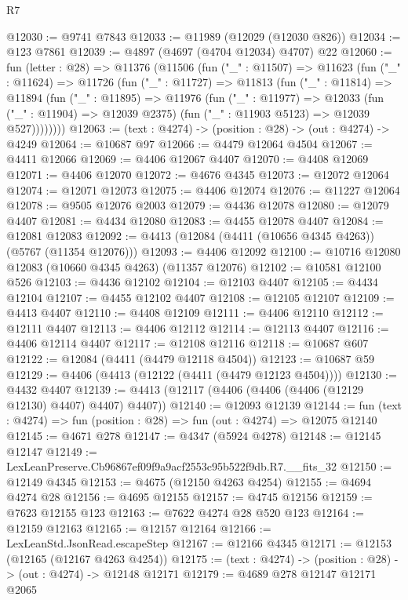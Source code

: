 \begin{lexlean}{R7}
\begin{coremodule}
@12030 := @9741 @7843
@12033 := @11989 (@12029 (@12030 @826))
@12034 := @123 @7861
@12039 := @4897 (@4697 (@4704 @12034) @4707) @22
@12060 := fun (letter : @28) =>
  @11376
    (@11506
      (fun ("_" : @11507) =>
      @11623
        (fun ("_" : @11624) =>
        @11726
          (fun ("_" : @11727) =>
          @11813
            (fun ("_" : @11814) =>
            @11894
              (fun ("_" : @11895) =>
              @11976
                (fun ("_" : @11977) =>
                @12033
                  (fun ("_" : @11904) => @12039 @2375)
                  (fun ("_" : @11903 @5123) => @12039 @527))))))))
@12063 := (text : @4274) -> (position : @28) -> (out : @4274) -> @4249
@12064 := @10687 @97
@12066 := @4479 @12064 @4504
@12067 := @4411 @12066
@12069 := @4406 @12067 @4407
@12070 := @4408 @12069
@12071 := @4406 @12070
@12072 := @4676 @4345
@12073 := @12072 @12064
@12074 := @12071 @12073
@12075 := @4406 @12074
@12076 := @11227 @12064
@12078 := @9505 @12076 @2003
@12079 := @4436 @12078
@12080 := @12079 @4407
@12081 := @4434 @12080
@12083 := @4455 @12078 @4407
@12084 := @12081 @12083
@12092 := @4413 (@12084 (@4411 (@10656 @4345 @4263)) (@5767 (@11354 @12076)))
@12093 := @4406 @12092
@12100 := @10716 @12080 @12083 (@10660 @4345 @4263) (@11357 @12076)
@12102 := @10581 @12100 @526
@12103 := @4436 @12102
@12104 := @12103 @4407
@12105 := @4434 @12104
@12107 := @4455 @12102 @4407
@12108 := @12105 @12107
@12109 := @4413 @4407
@12110 := @4408 @12109
@12111 := @4406 @12110
@12112 := @12111 @4407
@12113 := @4406 @12112
@12114 := @12113 @4407
@12116 := @4406 @12114 @4407
@12117 := @12108 @12116
@12118 := @10687 @607
@12122 := @12084 (@4411 (@4479 @12118 @4504))
@12123 := @10687 @59
@12129 := @4406 (@4413 (@12122 (@4411 (@4479 @12123 @4504))))
@12130 := @4432 @4407
@12139 := @4413 (@12117 (@4406 (@4406 (@4406 (@12129 @12130) @4407) @4407) @4407))
@12140 := @12093 @12139
@12144 := fun (text : @4274) => fun (position : @28) => fun (out : @4274) => @12075 @12140
@12145 := @4671 @278
@12147 := @4347 (@5924 @4278)
@12148 := @12145 @12147
@12149 := LexLeanPreserve.Cb96867ef09f9a9acf2553c95b522f9db.R7.__fits_32
@12150 := @12149 @4345
@12153 := @4675 (@12150 @4263 @4254)
@12155 := @4694 @4274 @28
@12156 := @4695 @12155
@12157 := @4745 @12156
@12159 := @7623 @12155 @123
@12163 := @7622 @4274 @28 @520 @123
@12164 := @12159 @12163
@12165 := @12157 @12164
@12166 := LexLeanStd.JsonRead.escapeStep
@12167 := @12166 @4345
@12171 := @12153 (@12165 (@12167 @4263 @4254))
@12175 := (text : @4274) -> (position : @28) -> (out : @4274) -> @12148 @12171
@12179 := @4689 @278 @12147 @12171 @2065

\end{coremodule}
\end{lexlean}
